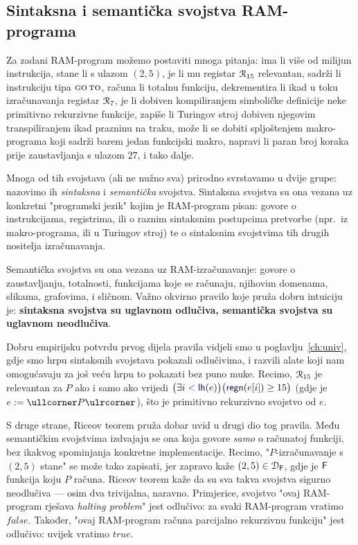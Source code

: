 \subsection{Sintaksna i semantička svojstva RAM-programa}

Za zadani RAM-program možemo postaviti mnoga pitanja: ima li više od milijun instrukcija, stane li s ulazom $(2,5)$, je li mu registar $\mathcal R_{15}$ relevantan, sadrži li instrukciju tipa $\textsc{go\,to}$, računa li totalnu funkciju, dekrementira li ikad u toku izračunavanja registar $\mathcal R_{7}$, je li dobiven kompiliranjem simboličke definicije neke primitivno rekurzivne funkcije, zapiše li Turingov stroj dobiven njegovim transpiliranjem ikad prazninu na traku, može li se dobiti spljoštenjem makro-programa koji sadrži barem jedan funkcijski makro, napravi li paran broj koraka prije zaustavljanja s ulazom $27$, i tako dalje.

Mnoga od tih svojstava (ali ne nužno sva) prirodno svrstavamo u dvije grupe: nazovimo ih \emph{sintaksna} i \emph{semantička} svojstva. Sintaksna svojstva su ona vezana uz konkretni "programski jezik" kojim je RAM-program pisan: govore o instrukcijama, registrima, ili o raznim sintaksnim postupcima pretvorbe (npr.\ iz makro-programa, ili u Turingov stroj) te o sintaksnim svojstvima tih drugih nositelja izračunavanja.

Semantička svojstva su ona vezana uz RAM-izračunavanje: govore o zaustavljanju, totalnosti, funkcijama koje se računaju, njihovim domenama, slikama, grafovima, i sličnom. Važno okvirno pravilo koje pruža dobru intuiciju je: \textbf{sintaksna svojstva su uglavnom odlučiva, semantička svojstva su uglavnom neodlučiva}.

Dobru empirijsku potvrdu prvog dijela pravila vidjeli smo u poglavlju~\ref{ch:univ}, gdje smo hrpu sintaksnih svojstava pokazali odlučivima, i razvili alate koji nam omogućavaju za još veću hrpu to pokazati bez puno muke. Recimo, $\mathcal R_{15}$ je relevantan za $P$ ako i samo ako vrijedi 
$\bigl(\exists i<\f{lh}(e)\bigr)\bigl(\f{regn}(e[i])\ge15\bigr)$ (gdje je $e:=\kprog P$), što je primitivno rekurzivno svojstvo od $e$.

S druge strane, Riceov teorem pruža dobar uvid u drugi dio tog pravila. Među semantičkim svojstvima izdvajaju se ona koja govore \emph{samo} o računatoj funkciji, bez ikakvog spominjanja konkretne implementacije. Recimo, "$P$-izračunavanje s $(2,5)$ stane" se može tako zapisati, jer zapravo kaže $(2,5)\in\dom{\f F}$, gdje je $\f F$ funkcija koju $P$ računa. Riceov teorem kaže da su sva takva svojstva sigurno neodlučiva --- osim dva trivijalna, naravno. Primjerice, svojstvo "ovaj RAM-program rješava \emph{halting problem}" jest odlučivo: za svaki RAM-program vratimo $\mathit{false}$. Također, "ovaj RAM-program računa parcijalno rekurzivnu funkciju" jest odlučivo: uvijek vratimo $\mathit{true}$.

